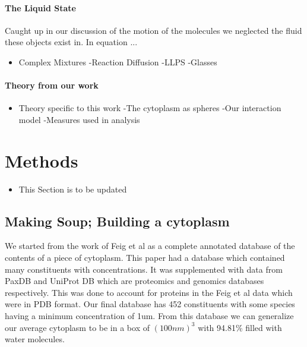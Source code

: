 \documentclass[a4paper,11pt,oneside]{book}
\begin{document}
\paragraph{The Liquid State}

Caught up in our discussion of the motion of the molecules we neglected the fluid these objects exist in. In equation ...

\begin{itemize}
\item Complex Mixtures \newline
-Reaction Diffusion \newline
-LLPS \newline
-Glasses
\end{itemize}

\paragraph{Theory from our work}

\begin{itemize}
\item Theory specific to this work \newline
-The cytoplasm as spheres \newline
-Our interaction model \newline
-Measures used in analysis
\end{itemize}

\section{Methods}

\begin{itemize}
\item This Section is to be updated
\end{itemize}

\subsection{Making Soup; Building a cytoplasm}

We started from the work of Feig et al as a complete annotated database of the contents of a piece of cytoplasm. This paper had a database which contained many constituents with concentrations. It was supplemented with data from PaxDB and UniProt DB which are proteomics and genomics databases respectively. This was done to account for proteins in the Feig et al data which were in PDB format. Our final database has 452 constituents with some species having a minimum concentration of 1um. From this database we can generalize our average cytoplasm to be in a box of $(100nm)^3$ with 94.81\% filled with water molecules.
\end{document}
